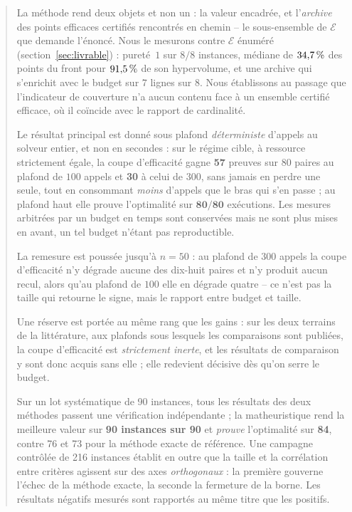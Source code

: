 \documentclass[11pt,a4paper]{article}
\theoremstyle{plain}
\theoremstyle{remark}
\newcommand{\Ecal}{\mathcal{E}}
\begin{document}
\begin{abstract}
La méthode rend deux objets et non un : la valeur encadrée, et
l'\emph{archive} des points efficaces certifiés rencontrés en chemin --
le sous-ensemble de $\Ecal$ que demande l'énoncé. Nous le mesurons contre
$\Ecal$ énuméré (section~\ref{sec:livrable}) : pureté~$1$ sur $8/8$
instances, médiane de $\cardMed{}\,\%$ des points du front pour $\hvMed{}\,\%$
de son hypervolume, et une archive qui s'enrichit avec le budget sur $7$
lignes sur $8$. Nous établissons au passage que l'indicateur de couverture
n'a aucun contenu face à un ensemble certifié efficace, où il coïncide avec
le rapport de cardinalité.

Le résultat principal est donné sous plafond \emph{déterministe} d'appels au
solveur entier, et non en secondes : sur le régime cible, à ressource
strictement égale, la coupe d'efficacité gagne \textbf{57} preuves sur $80$
paires au plafond de $100$ appels et \textbf{30} à celui de $300$, sans
jamais en perdre une seule, tout en consommant \emph{moins} d'appels que le
bras qui s'en passe ; au plafond haut elle prouve l'optimalité sur
$\mathbf{80/80}$ exécutions. Les mesures arbitrées par un budget en temps
sont conservées mais ne sont plus mises en avant, un tel budget n'étant pas
reproductible.

La remesure est poussée jusqu'à $n=50$ : au plafond de $300$ appels la coupe
d'efficacité n'y dégrade aucune des dix-huit paires et n'y produit aucun
recul, alors qu'au plafond de $100$ elle en dégrade quatre -- ce n'est pas la
taille qui retourne le signe, mais le rapport entre budget et taille.

Une réserve est portée au même rang que les gains : sur les deux terrains de
la littérature, aux plafonds sous lesquels les comparaisons sont publiées, la
coupe d'efficacité est \emph{strictement inerte}, et les résultats de
comparaison y sont donc acquis sans elle ; elle redevient décisive dès qu'on
serre le budget.

Sur un lot systématique de 90 instances, tous les résultats des deux méthodes
passent une vérification indépendante ; la matheuristique rend la meilleure
valeur sur \textbf{90 instances sur 90} et \emph{prouve} l'optimalité sur
\textbf{84}, contre 76 et 73 pour la méthode exacte de référence. Une
campagne contrôlée de 216 instances établit en outre que la taille et la
corrélation entre critères agissent sur des axes \emph{orthogonaux} : la
première gouverne l'échec de la méthode exacte, la seconde la fermeture de la
borne. Les résultats négatifs mesurés sont rapportés au même titre que les
positifs.
\end{abstract}
\end{document}
